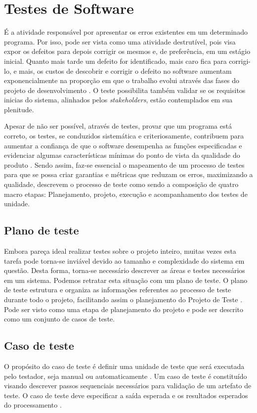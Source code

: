 \documentclass[tg]{mdtufsm}
\begin{document}
\section{Testes de Software}
É a atividade responsável por apresentar os erros existentes em um determinado programa. Por isso, pode ser vista como uma atividade destrutível, pois visa expor os defeitos para depois corrigir os mesmos e, de preferência, em
um estágio inicial. Quanto mais tarde um defeito for identificado, mais caro fica para corrigi-lo, e mais, os custos de descobrir e corrigir o defeito no software aumentam exponencialmente na proporção em que o trabalho
evolui através das fases do projeto de desenvolvimento \cite{boehm1976quantitative}. O teste possibilita também validar se os requisitos inicias do sistema, alinhados pelos \emph{stakeholders}, estão contemplados em sua plenitude.

Apesar de não ser possível, através de testes, provar que um programa está correto, os testes, se conduzidos sistemática e criteriosamente, contribuem para
aumentar a confiança de que o software desempenha as funções especificadas e evidenciar algumas características mínimas do ponto de vista da qualidade do produto \cite{maldonado2004introduccao}. Sendo assim,
faz-se essencial o mapeamento de um processo de testes para que se possa criar garantias e métricas que reduzam os erros, maximizando a qualidade, \citeauthor{crespo2004metodologia} \cite{crespo2004metodologia} descrevem o processo de
teste como sendo a composição de quatro macro etapas: Planejamento, projeto, execução e acompanhamento dos testes de unidade.

\subsection{Plano de teste}
Embora pareça ideal realizar testes sobre o projeto inteiro, muitas vezes esta tarefa pode torna-se inviável devido ao tamanho e complexidade do sistema em questão. Desta forma, torna-se necessário descrever as áreas e testes necessários em um sistema. Podemos retratar esta situação com um plano de teste.
O plano de teste estrutura e organiza as informações referentes  ao  processo  de  teste  durante  todo  o  projeto,  facilitando assim  o  planejamento  do  
Projeto  de  Teste \cite{piqueiro2015}. Pode ser visto como uma etapa de planejamento do projeto e pode ser descrito como um conjunto de casos de teste.

\subsection{Caso de teste}
O propósito do caso de teste é definir uma unidade de teste que será executada pelo testador, seja manual ou automaticamente \cite{rios2006teste}. Um caso de teste é constituído visando descrever passos sequenciais necessários para validação de um artefato de teste. O caso de teste deve especificar a saída esperada e os resultados esperados do processamento \cite{myers2011art}.
\end{document}
